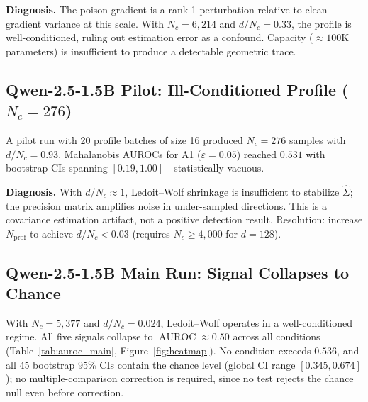 \documentclass[runningheads]{llncs}
\DeclareMathOperator{\AUROC}{AUROC}
\begin{document}
\textbf{Diagnosis.} The poison gradient is a rank-1 perturbation relative to
clean gradient variance at this scale. With $N_c = 6{,}214$ and $d/N_c = 0.33$,
the profile is well-conditioned, ruling out estimation error as a confound.
Capacity ($\approx 100$K parameters) is insufficient to produce a detectable
geometric trace.

\subsection{Qwen-2.5-1.5B Pilot: Ill-Conditioned Profile ($N_c = 276$)}

A pilot run with 20 profile batches of size 16 produced $N_c = 276$ samples
with $d/N_c = 0.93$. Mahalanobis AUROCs for A1 ($\varepsilon=0.05$) reached
$0.531$ with bootstrap CIs spanning $[0.19, 1.00]$---statistically vacuous.

\textbf{Diagnosis.} With $d/N_c \approx 1$, Ledoit--Wolf shrinkage is
insufficient to stabilize $\hat{\Sigma}$; the precision matrix amplifies noise
in under-sampled directions. This is a covariance estimation artifact, not a
positive detection result. Resolution: increase $N_{\text{prof}}$ to achieve
$d/N_c < 0.03$ (requires $N_c \geq 4{,}000$ for $d = 128$).

\subsection{Qwen-2.5-1.5B Main Run: Signal Collapses to Chance}\label{sec:qwen_main}

With $N_c = 5{,}377$ and $d/N_c = 0.024$, Ledoit--Wolf operates in a
well-conditioned regime. All five signals collapse to $\AUROC \approx 0.50$
across all conditions (Table~\ref{tab:auroc_main}, Figure~\ref{fig:heatmap}).
No condition exceeds $0.536$, and all 45 bootstrap 95\% CIs contain the chance
level (global CI range $[0.345, 0.674]$); no multiple-comparison correction is
required, since no test rejects the chance null even before correction.
\end{document}
